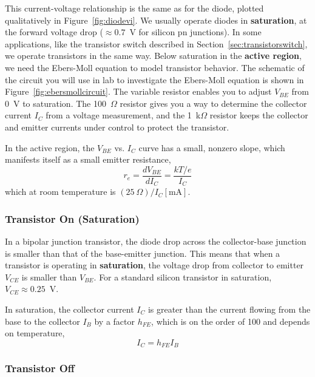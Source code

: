 \documentclass[11pt]{article}
\begin{document}
This current-voltage relationship is the same as for the diode,
plotted qualitatively in Figure~\ref{fig:diodevi}. We usually operate
diodes in \textbf{saturation}, at the forward voltage drop ($\approx
0.7$~V for silicon pn junctions). In some applications, like the
transistor switch described in Section~\ref{sec:transistorswitch}, we
operate transistors in the same way. Below saturation in the
\textbf{active region}, we need the Ebers-Moll equation to model
transistor behavior. The schematic of the circuit you will use in lab
to investigate the Ebers-Moll equation is shown in
Figure~\ref{fig:ebersmollcircuit}. The variable resistor enables you
to adjust $V_{BE}$ from 0~V to saturation. The 100~$\Omega$ resistor
gives you a way to determine the collector current $I_C$ from a
voltage measurement, and the 1~k$\Omega$ resistor keeps the collector
and emitter currents under control to protect the transistor.

In the active region, the $V_{BE}$ vs. $I_C$ curve has a small,
nonzero slope, which manifests itself as a small emitter resistance,
\begin{equation}
  r_e = \frac{d V_{BE}}{d I_C} = \frac{kT/e}{I_C}
\label{eq:emitterresistance}
\end{equation}
which at room temperature is $(25~\Omega)/I_C[\mathrm{mA}]$.

\subsubsection*{Transistor On (Saturation)}

In a bipolar junction transistor, the diode drop across the
collector-base junction is smaller than that of the base-emitter
junction.  This means that when a transistor is operating in
\textbf{saturation}, the voltage drop from collector to emitter
$V_{CE}$ is smaller than $V_{BE}$.  For a standard silicon transistor
in saturation, $V_{CE} \approx 0.25$~V.

In saturation, the collector current $I_C$ is greater than the current
flowing from the base to the collector $I_B$ by a factor $h_{FE}$,
which is on the order of 100 and depends on temperature,
\begin{equation}
  I_C = h_{FE} I_B
  \label{eq:hfe}
\end{equation}

\subsubsection*{Transistor Off}
\end{document}
